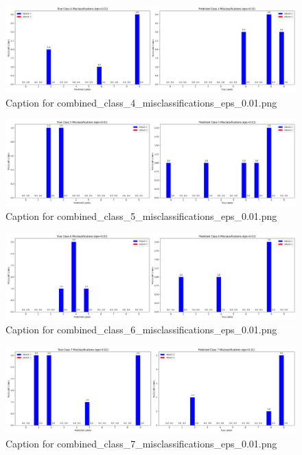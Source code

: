 \documentclass[11pt,onside]{article}
\begin{document}
\begin{figure}[ht]
\centering
\includegraphics[width=1\textwidth]{combined_class_boundary_pgd/combined_class_4_misclassifications_eps_0.01.png}
\caption{Caption for combined_class_4_misclassifications_eps_0.01.png}
\label{fig:combined_class_4_misclassifications_eps_0.01.png}
\end{figure}

\begin{figure}[ht]
\centering
\includegraphics[width=1\textwidth]{combined_class_boundary_pgd/combined_class_5_misclassifications_eps_0.01.png}
\caption{Caption for combined_class_5_misclassifications_eps_0.01.png}
\label{fig:combined_class_5_misclassifications_eps_0.01.png}
\end{figure}

\begin{figure}[ht]
\centering
\includegraphics[width=1\textwidth]{combined_class_boundary_pgd/combined_class_6_misclassifications_eps_0.01.png}
\caption{Caption for combined_class_6_misclassifications_eps_0.01.png}
\label{fig:combined_class_6_misclassifications_eps_0.01.png}
\end{figure}

\begin{figure}[ht]
\centering
\includegraphics[width=1\textwidth]{combined_class_boundary_pgd/combined_class_7_misclassifications_eps_0.01.png}
\caption{Caption for combined_class_7_misclassifications_eps_0.01.png}
\label{fig:combined_class_7_misclassifications_eps_0.01.png}
\end{figure}
\end{document}
